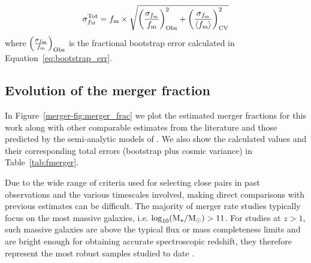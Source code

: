 \begin{equation}
\sigma_{f_{\rm{M}}}^{\text{Tot}}  = 
f_{\text{m}} \times
\sqrt{ 
\left (\frac{\sigma_{f_{\rm{m}}} }{ f_{\text{m}}}  \right )_{\text{Obs}}^{2}
+ 
\left (\frac{\sigma_{f_{\rm{m}}} }{ \left \langle f_{\text{m}}  \right \rangle}  \right )_{\text{CV}}^{2}
}	
\end{equation}
where $\left (\frac{\sigma_{f_{\rm{m}}} }{ f_{\text{m}}}  \right )_{\text{Obs}}$ is the fractional bootstrap error calculated in Equation~\ref{eq:bootstrap_err}.



\subsection{Evolution of the merger fraction}\label{merger-sec:mergerfraction}
In Figure~\ref{merger-fig:merger_frac} we plot the estimated merger fractions for this work along with other comparable estimates from the literature and those predicted by the semi-analytic models of \citet{Lu:2011hj}. We also show the calculated values and their corresponding total errors (bootstrap plus cosmic variance) in Table~\ref{tab:fmerger}. 

Due to the wide range of criteria used for selecting close pairs in past observations and the various timescales involved, making direct comparisons with previous estimates can be difficult. The majority of merger rate studies typically focus on the most massive galaxies, i.e. $\log_{10}(\text{M}_{\star} / \text{M}_{\odot}) > 11$. For studies at $z > 1$, such massive galaxies are above the typical flux or mass completeness limits and are bright enough for obtaining accurate spectroscopic redshift, they therefore represent the most robust samples studied to date \citep{Bluck:2009in,Man:2011jo}. 

